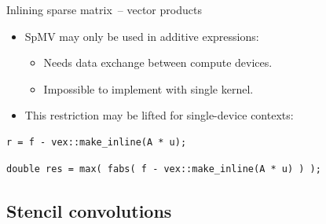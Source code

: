\documentclass[@BEAMER_OPTIONS@]{beamer}
\begin{document}
\begin{frame}[fragile]{Inlining sparse matrix~-- vector products}
    \begin{itemize}
        \item SpMV may only be used in additive expressions:
            \begin{itemize}
                \item Needs data exchange between compute devices.
                \item Impossible to implement with single kernel.
            \end{itemize}
        \item This restriction may be lifted for single-device contexts:
    \end{itemize}
    \begin{exampleblock}{}
        \begin{lstlisting}[numbers=none]
r = f - vex::make_inline(A * u);
        \end{lstlisting}
    \end{exampleblock}
    \pause
    \begin{exampleblock}{}
        \begin{lstlisting}[numbers=none]
double res = max( fabs( f - vex::make_inline(A * u) ) );
        \end{lstlisting}
    \end{exampleblock}
\end{frame}

\subsection{Stencil convolutions}
\end{document}
